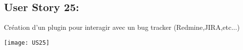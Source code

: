 \newpage{}
\subsection{User Story 25:}
Création d'un plugin pour interagir avec un bug tracker (Redmine,JIRA,etc...)


  \begin{center}
        \texttt{[image: US25]}
  \end{center}